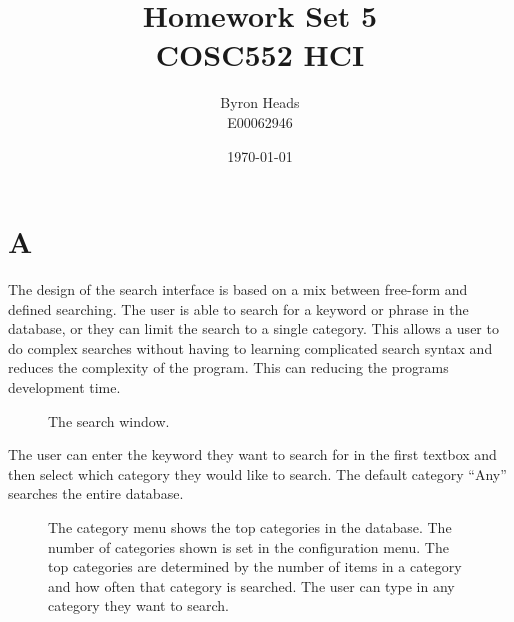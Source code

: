 \documentclass[12pt]{report}
\title{Homework Set 5 \\
    COSC552 HCI}
\author{ Byron Heads \\
    E00062946 }
\date{\today}
\begin{document}
\maketitle

\chapter*{A}

The design of the search interface is based on a mix between free-form and defined searching.  The user is able to search for a keyword or phrase in the database, or they can limit the search to a single category.  This allows a user to do complex searches without having to learning complicated search syntax and reduces the complexity of the program.  This can reducing the programs development time.

\begin{figure}[h!]
\caption{The search window.}
\end{figure}

The user can enter the keyword they want to search for in the first textbox and then select which category they would like to search.  The default category ``Any'' searches the entire database.

\begin{figure}[h!]
\caption{The category menu shows the top categories in the database.  The number of categories shown is set in the configuration menu.  The top categories are determined by the number of items in a category and how often that category is searched.  The user can type in any category they want to search.}
\end{figure}
\end{document}
